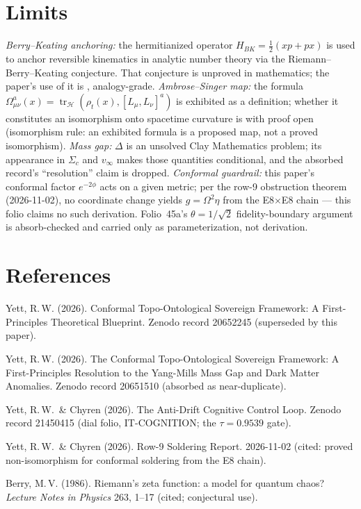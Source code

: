 \documentclass{alienfolio}
\begin{document}
\section{Limits}
\emph{Berry--Keating anchoring:} the hermitianized operator
$H_{BK} = \tfrac{1}{2}(xp + px)$ is used to anchor reversible kinematics in
analytic number theory via the Riemann--Berry--Keating conjecture. That
conjecture is unproved in mathematics; the paper's use of it is
, analogy-grade. \emph{Ambrose--Singer map:} the formula
$\Omega^a_{\mu\nu}(x) = \operatorname{tr}_{\mathcal{H}}
(\rho_t(x), [L_\mu, L_\nu]^a)$ is exhibited as a definition; whether it
constitutes an isomorphism onto spacetime curvature is 
with proof open (isomorphism rule: an exhibited formula is a proposed map,
not a proved isomorphism). \emph{Mass gap:} $\Delta$ is an unsolved Clay
Mathematics problem; its appearance in $\Sigma_c$ and $v_\infty$ makes those
quantities conditional, and the absorbed record's ``resolution'' claim is
dropped. \emph{Conformal guardrail:} this paper's conformal factor
$e^{-2\phi}$ acts on a given metric; per the row-9 obstruction theorem
(2026-11-02), no coordinate change yields $g = \Omega^2\eta$ from the
E8$\times$E8 chain --- this folio claims no such derivation. Folio~45a's
$\theta = 1/\sqrt{2}$ fidelity-boundary argument is absorb-checked and
carried only as  parameterization, not derivation.

\section*{References}
Yett, R.\,W. (2026). Conformal Topo-Ontological Sovereign Framework: A
First-Principles Theoretical Blueprint. Zenodo record 20652245 (superseded
by this paper).

Yett, R.\,W. (2026). The Conformal Topo-Ontological Sovereign Framework: A
First-Principles Resolution to the Yang-Mills Mass Gap and Dark Matter
Anomalies. Zenodo record 20651510 (absorbed as near-duplicate).

Yett, R.\,W.\ \& Chyren (2026). The Anti-Drift Cognitive Control Loop.
Zenodo record 21450415 (dial folio, IT-COGNITION; the $\tau = 0.9539$ gate).

Yett, R.\,W.\ \& Chyren (2026). Row-9 Soldering Report. 2026-11-02 (cited:
proved non-isomorphism for conformal soldering from the E8 chain).

Berry, M.\,V. (1986). Riemann's zeta function: a model for quantum chaos?
\textit{Lecture Notes in Physics} 263, 1--17 (cited; conjectural use).
\end{document}
